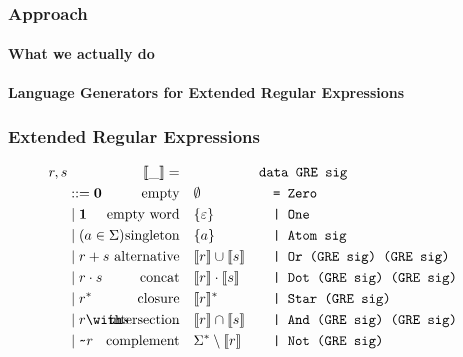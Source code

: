 \documentclass[pdftex]{beamer}
\begin{document}
\begin{frame}
  \frametitle{Approach}
  \framesubtitle{What we actually do}
  \begin{Huge}
    \begin{center}
      \bf
      Language Generators for Extended Regular Expressions
    \end{center}
  \end{Huge}
\end{frame}
\begin{frame}
  \frametitle{Extended Regular Expressions}
  \vspace{-\baselineskip}
  \footnotesize
  \begin{align*}
    r, s & &\Lang{\_}=\quad &  &
                             \makebox[1em][l]{\code{data GRE sig}}\\
         & ::= \Rnull & \ltext{empty}
                        & \emptyset
                           &&\code{= Zero}\\
         & \mid \Rempty & \ltext{empty word}
                        & \{ \varepsilon \}
                           && \code{| One}\\
         & \mid (a \in \Sigma) & \ltext{singleton}
                        &  \{ a \}
                           && \code{| Atom sig} \\
         & \mid \Runion rs & \ltext{alternative}
                        &  \Lang{r} \cup \Lang{s}
                           && \code{| Or (GRE sig) (GRE sig)}\\
         & \mid \Rconcat rs & \ltext{concat}
                        &  \Lang r \cdot \Lang s
                           && \code{| Dot (GRE sig) (GRE sig)}\\
         & \mid \Rstar r & \ltext{closure}
                        & \Lang r^* 
                           && \code{| Star (GRE sig)}\\
         & \mid \Rintersect rs & \ltext{intersection}
                        & \Lang r \cap \Lang s
                           && \code{| And (GRE sig) (GRE sig)}\\
         & \mid \Rcomplement r & \ltext{complement}
                        & \Sigma^* \setminus \Lang r
                           && \code{| Not (GRE sig)}
  \end{align*}
\end{frame} 
\end{document}
